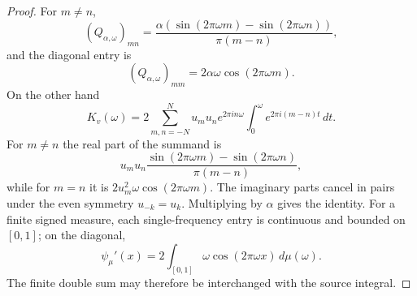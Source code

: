 \documentclass[10pt,a4paper]{amsart}
\newcommand{\dd}{\,d}
\begin{document}
\begin{proof}
For $m\ne n$,
\[
 (Q_{\alpha,\omega})_{mn}=
 \frac{\alpha(\sin(2\pi\omega m)-\sin(2\pi\omega n))}
      {\pi(m-n)},
\]
and the diagonal entry is
\[
        (Q_{\alpha,\omega})_{mm}=2\alpha\omega\cos(2\pi\omega m).
\]
On the other hand
\[
K_v(\omega)=
2\sum_{m,n=-N}^{N}u_m u_n e^{2\pi i n\omega}
 \int_0^\omega e^{2\pi i(m-n)t}\dd t .
\]
For $m\ne n$ the real part of the summand is
\[
u_m u_n
\frac{\sin(2\pi\omega m)-\sin(2\pi\omega n)}
     {\pi(m-n)},
\]
while for $m=n$ it is $2u_m^2\omega\cos(2\pi\omega m)$.  The imaginary parts
cancel in pairs under the even symmetry $u_{-k}=u_k$.  Multiplying by $\alpha$
gives the identity.  For a finite signed measure, each single-frequency entry
is continuous and bounded on $[0,1]$; on the diagonal,
\[
        \psi_\mu'(x)=2\int_{[0,1]}\omega\cos(2\pi\omega x)\dd\mu(\omega).
\]
The finite double sum may therefore be interchanged with the source integral.
\end{proof}
\end{document}
